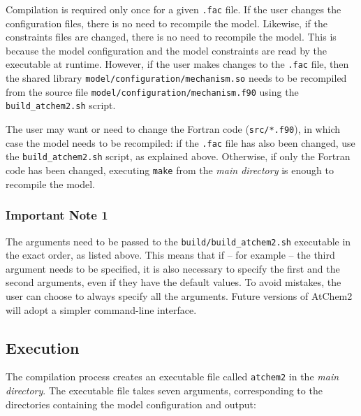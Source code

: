Compilation is required only once for a given \texttt{.fac} file. If
the user changes the configuration files, there is no need to
recompile the model. Likewise, if the constraints files are changed,
there is no need to recompile the model. This is because the model
configuration and the model constraints are read by the executable at
runtime. However, if the user makes changes to the \texttt{.fac} file,
then the shared library \texttt{model/configuration/mechanism.so}
needs to be recompiled from the source file
\texttt{model/configuration/mechanism.f90} using the \texttt{build\_atchem2.sh}
script.

The user may want or need to change the Fortran code
(\texttt{src/*.f90}), in which case the model needs to be recompiled:
if the \texttt{.fac} file has also been changed, use the
\texttt{build\_atchem2.sh} script, as explained above. Otherwise, if only the
Fortran code has been changed, executing \texttt{make} from the
\emph{main directory} is enough to recompile the model.

\subsubsection{Important Note 1} \label{important-note-1}

The arguments need to be passed to the \texttt{build/build\_atchem2.sh}
executable in the exact order, as listed above. This means that if --
for example -- the third argument needs to be specified, it is also
necessary to specify the first and the second arguments, even if they
have the default values. To avoid mistakes, the user can choose to
always specify all the arguments. Future versions of AtChem2 will
adopt a simpler command-line interface.

\subsection{Execution} \label{subsec:execution}

The compilation process creates an executable file called
\texttt{atchem2} in the \emph{main directory}. The executable file
takes seven arguments, corresponding to the directories containing the
model configuration and output:

